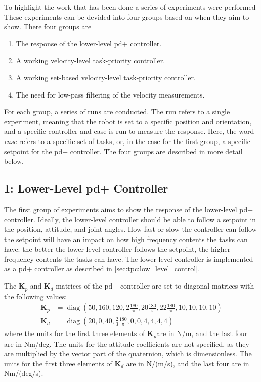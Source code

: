 To highlight the work that has been done a series of experiments were performed
These experiments can be devided into four groups based on when they aim to
show. There four groups are
\begin{enumerate}
    \item The response of the lower-level \gls{pd+} controller.
    \item A working velocity-level task-priority controller.
    \item A working set-based velocity-level task-priority controller.
    \item The need for low-pass filtering of the velocity measurements.
\end{enumerate}
For each group, a series of runs are conducted. The run refers to a single
experiment, meaning that the robot is set to a specific position and orientation,
and a specific controller and case is run to measure the response. Here, the word
\textit{case} refers to a specific set of tasks, or, in the case for the first
group, a specific setpoint for the \gls{pd+} controller. The four groups are described in more detail below.

\subsection*{1: Lower-Level \gls{pd+} Controller}
The first group of experiments aims to show the response of the lower-level \gls{pd+} controller.
Ideally, the lower-level controller should be able to follow a setpoint
in the position, attitude, and joint angles. How fast or slow the controller can follow
the setpoint will have an impact on how high frequency contents the tasks can have:
the better the lower-level controller follows the setpoint, the higher frequency contents
the tasks can have. The lower-level controller is implemented as a \gls{pd+} controller
as described in \autoref{sec:tpc:low_level_control}.

The \(\bm{K}_p\) and \(\bm{K}_d\) matrices of the \gls{pd+} controller are set to
diagonal matrices with the following values:
\begin{subequations}
\begin{align}
    \bm{K}_p &= \operatorname{diag}\left( 50, 160, 120, 2 \frac{180}{\pi}, 20 \frac{180}{\pi}, 22 \frac{180}{\pi}, 10, 10, 10, 10 \right) \\
    \bm{K}_d &= \operatorname{diag}\left( 20, 0, 40, \frac{2}{3} \frac{180}{\pi}, 0, 0, 4, 4, 4, 4 \right)
\end{align}
\end{subequations}
where the units for the first three elements of \(\bm{K}_p\)are in N/m, and the last four are in Nm/deg.
The units for the attitude coefficients are not specified, as they are multiplied by the
vector part of the quaternion, which is dimensionless. The units for the first three elements
of \(\bm{K}_d\) are in N/(m/s), and the last four are in Nm/(deg/s).

